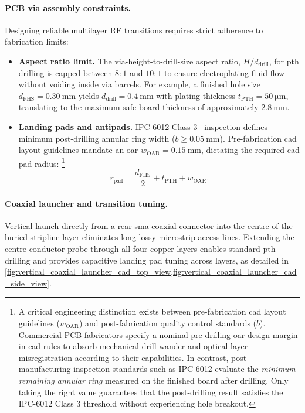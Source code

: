 \paragraph{PCB via assembly constraints.}
Designing reliable multilayer RF transitions requires strict adherence to fabrication limits:
\begin{itemize}
    \item \textbf{Aspect ratio limit.} The via-height-to-drill-size aspect ratio, $H / d_{\text{drill}}$, for \gls{pth} drilling is capped between $8:1$ and $10:1$ to ensure electroplating fluid flow without voiding inside via barrels.
    For example, a finished hole size $d_{\text{FHS}} = \qty{0.30}{\milli\metre}$ yields $d_{\text{drill}} = \qty{0.4}{\milli\metre}$ with plating thickness $t_{\text{PTH}} = \qty{50}{\micro\metre}$, translating to the maximum safe board thickness of approximately $\qty{2.8}{\milli\metre}$.
    \item \textbf{Landing pads and antipads.} IPC-6012 Class 3~\parencite{IPC6012RevisionStandard2023} inspection defines minimum post-drilling annular ring width ($b \ge \qty{0.05}{\milli\metre}$).
    Pre-fabrication \gls{cad} layout guidelines mandate an \gls{oar} $w_{\text{OAR}} = \qty{0.15}{\milli\metre}$, dictating the required \gls{cad} pad radius:%
        \footnote{A critical engineering distinction exists between pre-fabrication \gls{cad} layout guidelines ($w_{\text{OAR}}$) and post-fabrication quality control standards ($b$).
        Commercial PCB fabricators specify a nominal pre-drilling \gls{oar} design margin in \gls{cad} rules to absorb mechanical drill wander and optical layer misregistration according to their capabilities.
        In contrast, post-manufacturing inspection standards such as IPC-6012 evaluate the \textit{minimum remaining annular ring} measured on the finished board after drilling.
        Only taking the right value guarantees that the post-drilling result satisfies the IPC-6012 Class 3 threshold without experiencing hole breakout.}
    \begin{equation}
        \label{eq:cad-pad-radius}
        r_{\text{pad}} = \frac{d_{\text{FHS}}}{2} + t_{\text{PTH}} + w_{\text{OAR}}.
    \end{equation}
\end{itemize}

\paragraph{Coaxial launcher and transition tuning.}
Vertical launch directly from a rear \gls{sma} coaxial connector into the centre of the buried stripline layer eliminates long lossy microstrip access lines.
Extending the centre conductor probe through all four copper layers enables standard \gls{pth} drilling and provides capacitive landing pad tuning across layers, as detailed in \cref{fig:vertical_coaxial_launcher_cad_top_view,fig:vertical_coaxial_launcher_cad_side_view}.

